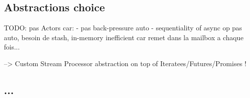 \subsection{Abstractions choice}

TODO: pas Actors car:
- pas back-pressure auto
- sequentiality of async op pas auto, besoin de stash, in-memory inefficient car remet dans la mailbox a chaque fois...

--> Custom Stream Processor abstraction on top of Iteratees/Futures/Promises !

\subsection{...}




